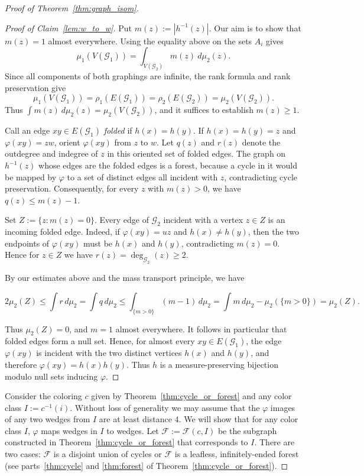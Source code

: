 \documentclass{article}
\theoremstyle{plain}
\theoremstyle{definition}
\newcommand{\cG}{\mathcal{G}}
\newcommand{\cF}{\mathcal{F}}
\newcommand{\fg}{\varphi}
\begin{document}
\begin{proof}[Proof of Theorem~\ref{thm:graph_isom}]
\begin{proof}[Proof of Claim~\ref{lem:w_to_w}]
Put $m(z):=|h^{-1}(z)|$. Our aim is to show that $m(z)=1$ almost everywhere. Using the equality above on the sets $A_i$ gives
\[
\mu_1(V(\cG_1))
=\int_{V(\cG_2)}m(z) \ d\mu_2(z).
\]
Since all components of both graphings are infinite, the rank formula and rank preservation give 
\[
\mu_1(V(\cG_1))=\rho_1(E(\cG_1))=\rho_2(E(\cG_2))=\mu_2(V(\cG_2)).
\]
Thus $\int m(z) \ d\mu_2(z)=\mu_2(V(\cG_2))$, and it suffices to establish $m(z) \geq 1$. 

Call an edge $xy\in E(\cG_1)$ \emph{folded} if $h(x)=h(y)$. If $h(x)=h(y)=z$ and $\varphi(xy)=zw$, orient $\varphi(xy)$ from $z$ to $w$. Let $q(z)$ and $r(z)$ denote the outdegree and indegree of $z$ in this oriented set of folded edges. The graph on $h^{-1}(z)$ whose edges are the folded edges is a forest, because a cycle in it would be mapped by $\varphi$ to a set of distinct edges all incident with $z$, contradicting cycle preservation. Consequently, for every $z$ with $m(z)>0$, we have $q(z)\leq m(z)-1$. 

Set $Z:=\{z:m(z)=0\}$. Every edge of $\cG_2$ incident with a vertex $z\in Z$ is an incoming folded edge. Indeed, if $\varphi(xy)=uz$ and $h(x)\neq h(y)$, then the two endpoints of $\varphi(xy)$ must be $h(x)$ and $h(y)$, contradicting $m(z)=0$. Hence for $z\in Z$ we have $r(z)=\deg_{\cG_2}(z)\geq2$.

By our estimates above and the mass transport principle, we have

\[2 \mu_2(Z) \leq \int r\,d\mu_2 = \int q\,d\mu_2 \leq \int_{\{m>0\}}(m-1)\,d\mu_2=\int m\,d\mu_2-\mu_2(\{m>0\})
      =\mu_2(Z).\]

Thus $\mu_2(Z)=0$, and $m=1$ almost everywhere. It follows in particular that folded edges form a null set. Hence, for almost every $xy\in E(\cG_1)$, the edge $\varphi(xy)$ is incident with the two distinct vertices $h(x)$ and $h(y)$, and therefore $\varphi(xy)=h(x)h(y)$. Thus $h$ is a measure-preserving bijection modulo null sets inducing $\varphi$.
\end{proof}

Consider the coloring $c$ given by Theorem~\ref{thm:cycle_or_forest} and any color class $I:=c^{-1}(i)$. Without loss of generality we may assume that the $\fg$ images of any two wedges from $I$ are at least distance $4$.
We will show that for any color class $I$, $\fg$ maps wedges in $I$ to wedges. Let $\cF:=\cF(c,I)$ be the subgraph constructed in Theorem~\ref{thm:cycle_or_forest} that corresponds to $I$. There are two cases: $\cF$ is a disjoint union of cycles or $\cF$ is a leafless, infinitely-ended forest (see parts~\ref{thm:cycle} and \ref{thm:forest} of Theorem~\ref{thm:cycle_or_forest}).
    

\end{proof}
\end{document}
